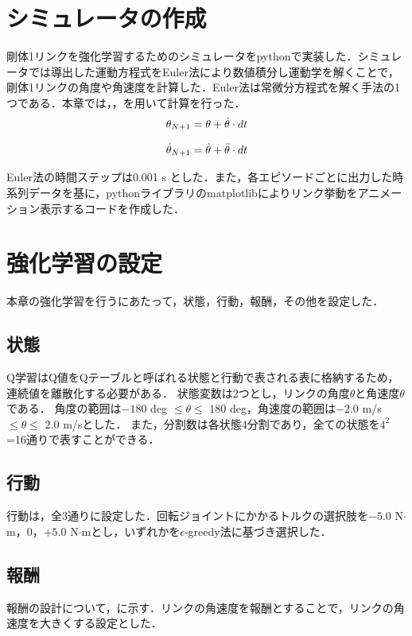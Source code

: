 \section{シミュレータの作成}
剛体1リンクを強化学習するためのシミュレータをpythonで実装した．シミュレータでは導出した運動方程式をEuler法\cite{euler}により数値積分し運動学を解くことで，剛体1リンクの角度や角速度を計算した．Euler法は常微分方程式を解く手法の1つである．本章では，，を用いて計算を行った．\\

\begin{eqnarray}
  \equlabel{3.13}
  \theta_{N + 1} = \theta + \dot{\theta} \cdot dt
\end{eqnarray}

\begin{eqnarray}
  \equlabel{3.14}
  \dot{\theta}_{N + 1} = \dot{\theta} + \ddot{\theta} \cdot dt
\end{eqnarray}

Euler法の時間ステップは0.001 s とした．また，各エピソードごとに出力した時系列データを基に，pythonライブラリのmatplotlibによりリンク挙動をアニメーション表示するコードを作成した．
\section{強化学習の設定}
本章の強化学習を行うにあたって，状態，行動，報酬，その他を設定した．
\subsection{状態}
Q学習はQ値をQテーブルと呼ばれる状態と行動で表される表に格納するため，連続値を離散化する必要がある．
状態変数は2つとし，リンクの角度$\theta$と角速度$\dot{\theta}$である．
角度の範囲は$-180$ deg $\leq \theta \leq$ $180$ deg，角速度の範囲は$-2.0$ m/s $\leq \dot{\theta} \leq$ $2.0$ m/sとした．
また，分割数は各状態4分割であり，全ての状態を$4^{2}$=16通りで表すことができる．
\subsection{行動}
行動は，全3通りに設定した．回転ジョイントにかかるトルクの選択肢を$-5.0$ N$\cdot$m，$0$，$+5.0$ N$\cdot$mとし，いずれかを$\epsilon$-greedy法に基づき選択した．
\subsection{報酬}
報酬の設計について，に示す．リンクの角速度を報酬とすることで，リンクの角速度を大きくする設定とした．

